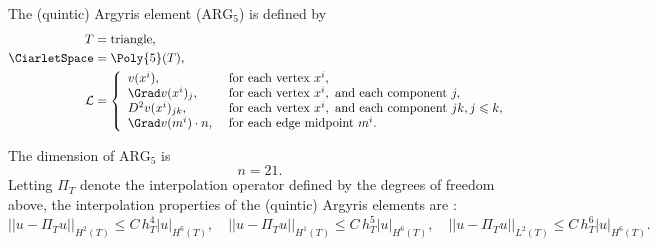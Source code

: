 \begin{definition}
  The (quintic) Argyris element ($\mathrm{ARG}_5$) is defined by
  \begin{align}
    T &= \mathrm{triangle}, \\
    \CiarletSpace &= \Poly{5}(T), \\
    \mathcal{L} &=
    \left \{
    \begin{array}{ll}
      v(x^i),
      &\text{ for each vertex } x^i, \\
      \Grad v(x^i)_j,
      &\text{ for each vertex } x^i, \text{ and each component } j, \\
      D^2 v(x^i)_{jk},
      &\text{ for each vertex } x^i, \text{ and each component } jk, j \leqslant k, \\
      \Grad v(m^i) \cdot n,
      &\text{ for each edge midpoint } m^i. \\
    \end{array}
    \right .
  \end{align}
\end{definition}
The dimension of $\mathrm{ARG}_5$ is
\begin{equation}
  n = 21.
\end{equation}
Letting $\Pi_T$ denote the interpolation operator defined by the
degrees of freedom above, the interpolation properties of the
(quintic) Argyris elements are \citep[Chapter II.6]{Braess2007}:
\begin{equation}
  ||u - \Pi_T u||_{H^2(T)} \leqslant C \, h_T^{4} |u|_{H^6(T)}, \quad
  ||u - \Pi_T u||_{H^1(T)} \leqslant C \, h_T^{5} |u|_{H^6(T)}, \quad
  ||u - \Pi_T u||_{L^2(T)} \leqslant C \, h_T^{6} |u|_{H^6(T)}.
\end{equation}


